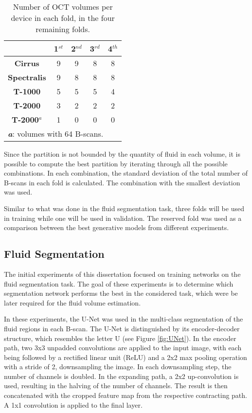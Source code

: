 \begin{table*}[!ht]
	\setlength{\tabcolsep}{6pt}
	\renewcommand{\arraystretch}{1.3}
	\caption{Number of OCT volumes per device in each fold, in the four remaining folds.}
	\centering
	\begin{tabular}{|c|c|c|c|c|}
		\hline
		& \textbf{1$^{st}$} & \textbf{2$^{nd}$} & \textbf{3$^{rd}$} & \textbf{4$^{th}$} \\
		\hline
		\textbf{Cirrus} & 9 & 9 & 8 & 8 \\
		\textbf{Spectralis} & 9 & 8 & 8 & 8 \\
		\textbf{T-1000} & 5 & 5 & 5 & 4 \\
		\textbf{T-2000} & 3 & 2 & 2 & 2 \\
		\textbf{T-2000$^{a}$} & 1 & 0 & 0 & 0 \\
		\hline
		\multicolumn{5}{l}{\textbf{\textit{a}}: volumes with 64 B-scans.} \\
	\end{tabular}
	\label{tab:FourFoldSplit}
\end{table*}

Since the partition is not bounded by the quantity of fluid in each volume, it is possible to compute the best partition by iterating through all the possible combinations. In each combination, the standard deviation of the total number of B-scans in each fold is calculated. The combination with the smallest deviation was used. 
\par
Similar to what was done in the fluid segmentation task, three folds will be used in training while one will be used in validation. The reserved fold was used as a comparison between the best generative models from different experiments.

\subsection{Fluid Segmentation}
The initial experiments of this dissertation focused on training networks on the fluid segmentation task. The goal of these experiments is to determine which segmentation network performs the best in the considered task, which were be later required for the fluid volume estimation.
\par
In these experiments, the U-Net \parencite{Ronneberger2015} was used in the multi-class segmentation of the fluid regions in each B-scan. The U-Net is distinguished by its encoder-decoder structure, which resembles the letter U (see Figure \ref{fig:UNet}). In the encoder path, two 3x3 unpadded convolutions are applied to the input image, with each being followed by a rectified linear unit (ReLU) and a 2x2 max pooling operation with a stride of 2, downsampling the image. In each downsampling step, the number of channels is doubled. In the expanding path, a 2x2 up-convolution is used, resulting in the halving of the number of channels. The result is then concatenated with the cropped feature map from the respective contracting path. A 1x1 convolution is applied to the final layer.

